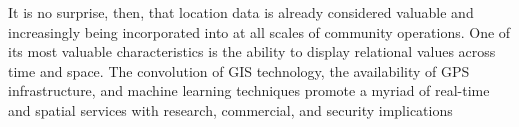 It is no surprise, then, that location data is already considered valuable and increasingly being incorporated into at all scales of community operations\cite{Bhattacharya2018, Roche2012}. %
One of its most valuable characteristics is the ability to display relational values across time and space\cite{McQueenBaker2019}. %
The convolution of GIS technology, the availability of GPS infrastructure, and machine learning techniques promote a myriad of real-time and spatial services with research, commercial, and security implications \cite{Barns2020, Al-Olimat2018} %


